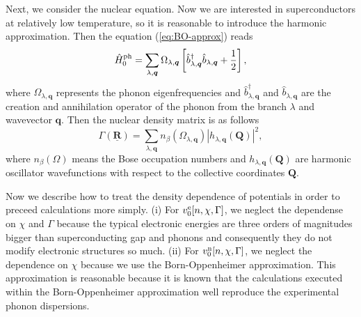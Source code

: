 Next, we consider the nuclear equation. Now we are interested in superconductors at relatively low temperature, 
so it is reasonable to introduce the harmonic approximation. Then the equation (\ref{eq:BO-approx}) reads
%
\begin{equation}
	\hat{H}^{\rm ph}_{\rm 0} = \sum_{\lambda, \bm{q}}\Omega_{\lambda, \bm{q}}
	\left[\hat{b}^{\dag}_{\lambda, \bm{q}}\hat{b}_{\lambda, \bm{q}} + \frac{1}{2} \right],
	\label{eq:harm}
\end{equation}
%
where $\Omega_{\lambda, \bm{q}}$ represents the phonon eigenfrequencies and 
$\hat{b}^{\dag}_{\lambda, \bm{q}}$ and $\hat{b}_{\lambda, \bm{q}}$ are the creation and annihilation
operator of the phonon from the branch $\lambda$ and wavevector $\bm{q}$.
Then the nuclear density matrix is as follows
%
\begin{equation}
	\Gamma(\underline{\bm{R}}) = \sum_{\lambda, \bm{q}}n_\beta(\Omega_{\lambda, \bm{q}})
	|h_{\lambda, \bm{q}}(\bm{Q})|^2,
\end{equation}
%
where $n_\beta(\Omega)$ means the Bose occupation numbers and $h_{\lambda, \bm{q}}(\bm{Q})$ are
harmonic oscillator wavefunctions with respect to the collective coordinates $\bm{Q}$.

%
Now we describe how to treat the density dependence of potentials in order to preceed calculations more simply.
(i) For $v^{\rm e}_0[n, \chi, \Gamma]$, we neglect the dependense on $\chi$ and $\Gamma$ because 
the typical electronic energies are three orders of magnitudes bigger than superconducting gap and phonons
and consequently they do not modify electronic structures so much.
(ii) For $v^{\rm n}_0[n, \chi, \Gamma]$, we neglect the dependence on $\chi$ because
we use the Born-Oppenheimer approximation. This approximation is reasonable because
it is known that the calculations executed within the Born-Oppenheimer approximation well reproduce
the experimental phonon dispersions\cite{Baroni2001}.

